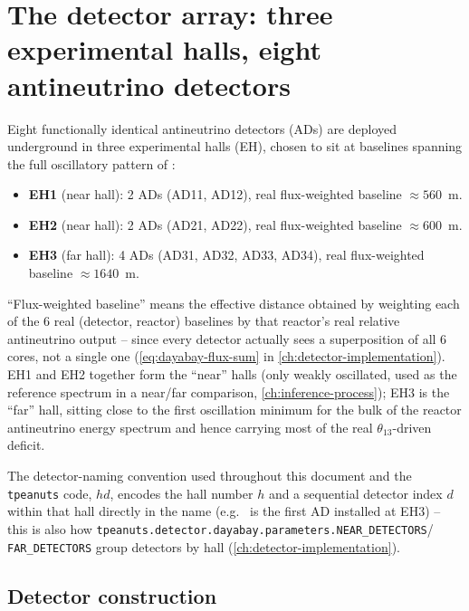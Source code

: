 \section{The detector array: three experimental halls, eight antineutrino detectors}
\label{sec:detector-geometry}

\begin{theorybox}
Eight functionally identical antineutrino detectors (ADs) are deployed
underground in three experimental halls (EH), chosen to sit at baselines
spanning the full oscillatory pattern of :
\begin{itemize}
  \item \textbf{EH1} (near hall): 2 ADs (AD11, AD12), real flux-weighted
    baseline $\approx 560$~m.
  \item \textbf{EH2} (near hall): 2 ADs (AD21, AD22), real flux-weighted
    baseline $\approx 600$~m.
  \item \textbf{EH3} (far hall): 4 ADs (AD31, AD32, AD33, AD34), real
    flux-weighted baseline $\approx 1640$~m.
\end{itemize}
``Flux-weighted baseline'' means the effective distance obtained by
weighting each of the 6 real (detector, reactor) baselines by that
reactor's real relative antineutrino output -- since every detector
actually sees a superposition of all 6 cores, not a single one
(\cref{eq:dayabay-flux-sum} in \cref{ch:detector-implementation}). EH1 and
EH2 together form the ``near'' halls (only weakly oscillated, used as the
reference spectrum in a near/far comparison, \cref{ch:inference-process});
EH3 is the ``far'' hall, sitting close to the first oscillation minimum for
the bulk of the reactor antineutrino energy spectrum and hence carrying
most of the real $\theta_{13}$-driven deficit.

The detector-naming convention used throughout this document and the
\texttt{tpeanuts} code, $hd$, encodes the hall number $h$ and a
sequential detector index $d$ within that hall directly in the name (e.g.\
 is the first AD installed at EH3) -- this is also how
\texttt{tpeanuts.detector.dayabay.parameters.NEAR\_DETECTORS}/
\texttt{FAR\_DETECTORS} group detectors by hall
(\cref{ch:detector-implementation}).
\end{theorybox}

\subsection*{Detector construction}

